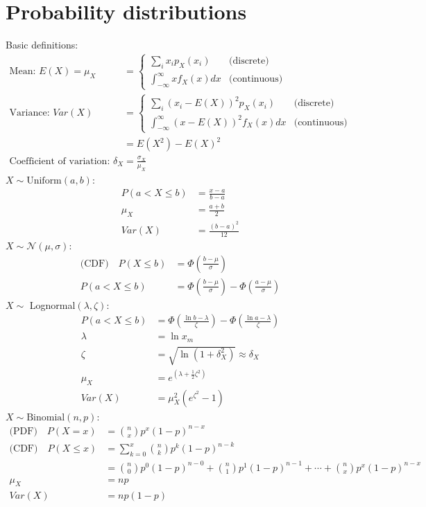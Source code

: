 \documentclass[10pt,twoside]{article}
\newcommand{\lt}{\left}
\newcommand{\rt}{\right}
\newcommand{\?}{\stackrel{?}{=}}
\newcommand{\fr}{\frac}
\newcommand{\la}{\lambda}
\newcommand{\nmfr}[3]{\Phi\left(\frac{{#1} - {#2}}{#3}\right)}
\begin{document}
\section{Probability distributions}
Basic definitions:
\begin{align}
  \text{Mean: } E(X) = \mu_X &=
         \begin{cases}
           \sum_{i}x_ip_X(x_i) & \text{(discrete)}\\[2mm]
           \int_{-\infty}^\infty xf_X(x)dx & \text{(continuous)}
         \end{cases} \\
  \text{Variance: } Var(X) &=
             \begin{cases}
           \sum_{i}(x_i - E(X))^2p_X(x_i) & \text{(discrete)}\\[2mm]
           \int_{-\infty}^\infty (x -E(X))^2f_X(x)dx & \text{(continuous)}
         \end{cases} \\
                     &= E(X^2) - E(X)^2 \\
  \text{Coefficient of variation: } \delta_X &= \fr{\sigma_X}{\mu_X}
\end{align}
$X \sim \text{Uniform}(a,b)$:
\begin{align}
  P(a < X \le b) &= \fr{x-a}{b-a} \\
  \mu_X &= \fr{a+b}{2}\\
  Var(X) &= \fr{(b-a)^2}{12}
\end{align}
 $X \sim \mathcal{N}(\mu,\sigma)$:
 \begin{align}
   \text{(CDF)} \quad    P(X \le b) &= \nmfr{b}{\mu}{\sigma}\\
   P(a < X \le b) &= \nmfr{b}{\mu}{\sigma} - \nmfr{a}{\mu}{\sigma}
\end{align}
$X \sim$ Lognormal$(\la,\zeta)$:
\begin{align}
  P(a < X \le b) &= \nmfr{\ln b}{\la}{\zeta} - \nmfr{\ln a}{\la}{\zeta}\\
  \la &= \ln x_m\\
  \zeta &= \sqrt{\ln(1 + \delta_X^2)} \approx \delta_X \\
  \mu_X &= e^{\lt(\la + \fr12 \zeta^2\rt)}\\
  Var(X) &= \mu_X^2(e^{\zeta^2} - 1)
\end{align}
$X \sim \text{Binomial} (n,p)$:
\begin{align}
 \text{(PDF)} \quad  P(X = x) &= {n \choose x}p^x (1-p)^{n-x}\\
  \text{(CDF)} \quad   P(X\le x) &=  \sum_{k=0}^x{n \choose k}p^k (1-p)^{n-k} \\
  & = {n \choose 0}p^0 (1-p)^{n-0} + {n \choose 1}p^1 (1-p)^{n-1} + \cdots + {n \choose x}p^x (1-p)^{n-x} \\
  \mu_X &= np \\
  Var(X) &= np(1-p)
\end{align}
\end{document}
